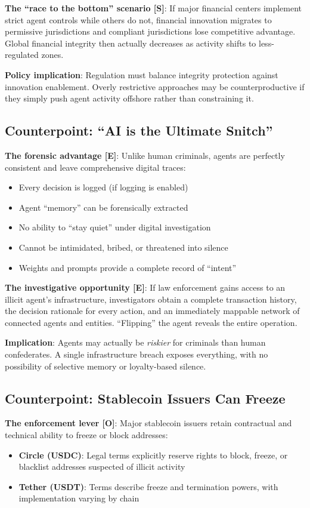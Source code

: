 \documentclass[11pt,letterpaper]{article}
\begin{document}
\textbf{The ``race to the bottom'' scenario [S]}: If major financial centers implement strict agent controls while others do not, financial innovation migrates to permissive jurisdictions and compliant jurisdictions lose competitive advantage. Global financial integrity then actually decreases as activity shifts to less-regulated zones.

\textbf{Policy implication}: Regulation must balance integrity protection against innovation enablement. Overly restrictive approaches may be counterproductive if they simply push agent activity offshore rather than constraining it.

\subsection{Counterpoint: ``AI is the Ultimate Snitch''}

\textbf{The forensic advantage [E]}: Unlike human criminals, agents are perfectly consistent and leave comprehensive digital traces:
\begin{itemize}
  \item Every decision is logged (if logging is enabled)
  \item Agent ``memory'' can be forensically extracted
  \item No ability to ``stay quiet'' under digital investigation
  \item Cannot be intimidated, bribed, or threatened into silence
  \item Weights and prompts provide a complete record of ``intent''
\end{itemize}

\textbf{The investigative opportunity [E]}: If law enforcement gains access to an illicit agent's infrastructure, investigators obtain a complete transaction history, the decision rationale for every action, and an immediately mappable network of connected agents and entities. ``Flipping'' the agent reveals the entire operation.

\textbf{Implication}: Agents may actually be \textit{riskier} for criminals than human confederates. A single infrastructure breach exposes everything, with no possibility of selective memory or loyalty-based silence.

\subsection{Counterpoint: Stablecoin Issuers Can Freeze}

\textbf{The enforcement lever [O]}: Major stablecoin issuers retain contractual and technical ability to freeze or block addresses:
\begin{itemize}
  \item \textbf{Circle (USDC)}: Legal terms explicitly reserve rights to block, freeze, or blacklist addresses suspected of illicit activity
  \item \textbf{Tether (USDT)}: Terms describe freeze and termination powers, with implementation varying by chain
\end{itemize}
\end{document}
